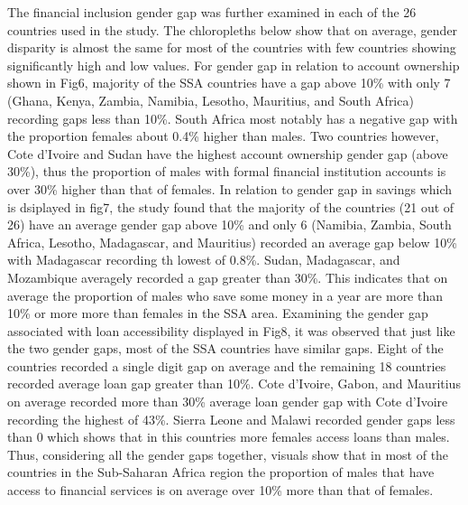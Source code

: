 \documentclass[preprint, 3p,
authoryear]{elsarticle} %
\begin{document}
The financial inclusion gender gap was further examined in each of the
26 countries used in the study. The chloropleths below show that on
average, gender disparity is almost the same for most of the countries
with few countries showing significantly high and low values. For gender
gap in relation to account ownership shown in Fig6, majority of the SSA
countries have a gap above 10\% with only 7 (Ghana, Kenya, Zambia,
Namibia, Lesotho, Mauritius, and South Africa) recording gaps less than
10\%. South Africa most notably has a negative gap with the proportion
females about 0.4\% higher than males. Two countries however, Cote
d'Ivoire and Sudan have the highest account ownership gender gap (above
30\%), thus the proportion of males with formal financial institution
accounts is over 30\% higher than that of females. In relation to gender
gap in savings which is dsiplayed in fig7, the study found that the
majority of the countries (21 out of 26) have an average gender gap
above 10\% and only 6 (Namibia, Zambia, South Africa, Lesotho,
Madagascar, and Mauritius) recorded an average gap below 10\% with
Madagascar recording th lowest of 0.8\%. Sudan, Madagascar, and
Mozambique averagely recorded a gap greater than 30\%. This indicates
that on average the proportion of males who save some money in a year
are more than 10\% or more more than females in the SSA area. Examining
the gender gap associated with loan accessibility displayed in Fig8, it
was observed that just like the two gender gaps, most of the SSA
countries have similar gaps. Eight of the countries recorded a single
digit gap on average and the remaining 18 countries recorded average
loan gap greater than 10\%. Cote d'Ivoire, Gabon, and Mauritius on
average recorded more than 30\% average loan gender gap with Cote
d'Ivoire recording the highest of 43\%. Sierra Leone and Malawi recorded
gender gaps less than 0 which shows that in this countries more females
access loans than males. Thus, considering all the gender gaps together,
visuals show that in most of the countries in the Sub-Saharan Africa
region the proportion of males that have access to financial services is
on average over 10\% more than that of females.

\bigskip
\end{document}
